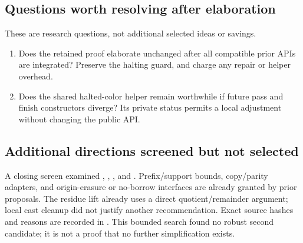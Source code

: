 \subsection{Questions worth resolving after elaboration}
These are research questions, not additional selected ideas or savings.
\begin{enumerate}
\item Does the retained proof elaborate unchanged after all compatible prior APIs are integrated? Preserve the halting guard, and charge any repair or helper overhead.
\item Does the shared halted-color helper remain worthwhile if future pass and finish constructors diverge? Its private status permits a local adjustment without changing the public API.
\end{enumerate}


\subsection{Additional directions screened but not selected}
A closing screen examined , , , and . Prefix/support bounds, copy/parity adapters, and origin-erasure or no-borrow interfaces are already granted by prior proposals. The residue lift already uses a direct quotient/remainder argument; local cast cleanup did not justify another recommendation. Exact source hashes and reasons are recorded in . This bounded search found no robust second candidate; it is not a proof that no further simplification exists.

\endgroup
